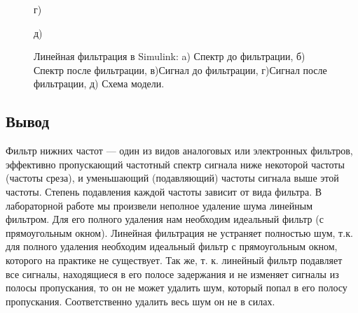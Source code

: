 \documentclass[10pt,a4paper]{article}
\begin{document}
\begin{figure}[H]
\begin{minipage}[h]{0.6\linewidth}
\end{minipage}
\hfill
\begin{minipage}[h]{0.6\linewidth}
 г) \\
\end{minipage}
\hfill
\begin{minipage}[h]{0.6\linewidth}
 д) \\
\end{minipage}
\caption{Линейная фильтрация в Simulink: a) Спектр до фильтрации, б)
Спектр после фильтрации, в)Сигнал до фильтрации, г)Сигнал после фильтрации, д) Схема модели.}
\label{ris:experimentalcorrelationsignals}
\end{figure}
\subsection{Вывод}
Фильтр нижних частот — один из видов аналоговых или электронных фильтров, эффективно пропускающий частотный спектр сигнала ниже некоторой частоты (частоты среза), и уменьшающий (подавляющий) частоты сигнала выше этой частоты. Степень подавления каждой частоты зависит от вида фильтра. В лабораторной работе мы произвели неполное удаление шума линейным фильтром. Для его полного удаления нам необходим идеальный фильтр (с прямоугольным окном). Линейная фильтрация не устраняет полностью шум, т.к. для полного удаления необходим идеальный фильтр с прямоугольным окном, которого на практике не существует. Так же, т. к. линейный фильтр подавляет все сигналы, находящиеся в его полосе задержания и не изменяет сигналы из полосы пропускания, то он не может удалить шум, который попал в его полосу 
пропускания. Соответственно удалить весь шум он не в силах. 
\end{document}
